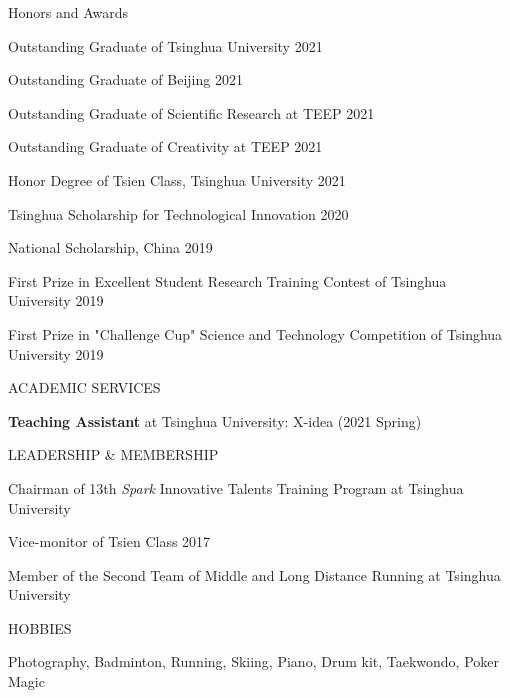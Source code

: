 \documentclass{resume} %
\begin{document}
	\begin{rSection}{Honors and Awards} {} \itemsep -2pt {}  
		\item Outstanding Graduate of Tsinghua University \hfill{2021}
		\item Outstanding Graduate of Beijing \hfill{2021}
		\item Outstanding Graduate of Scientific Research at TEEP \hfill{2021}
		\item Outstanding Graduate of Creativity at TEEP \hfill{2021}
		\item Honor Degree of Tsien Class, Tsinghua University \hfill{2021}
		\item Tsinghua Scholarship for Technological Innovation \hfill{2020}
		\item National Scholarship, China \hfill{2019}
		\item First Prize in Excellent Student Research Training Contest of Tsinghua University \hfill{2019}
		\item First Prize in "Challenge Cup" Science and Technology Competition of Tsinghua University \hfill{2019}
	\end{rSection}

	\begin{rSection}{ACADEMIC SERVICES}
		\item \textbf{Teaching Assistant} at Tsinghua University: X-idea (2021 Spring)
	\end{rSection}

	\begin{rSection}{LEADERSHIP \& MEMBERSHIP}
		\item Chairman of 13th \textsl{Spark} Innovative Talents Training Program at Tsinghua University
		\item Vice-monitor of Tsien Class 2017
		\item Member of the Second Team of Middle and Long Distance Running at Tsinghua University
	\end{rSection}

	\begin{rSection}{HOBBIES}
		\item Photography, Badminton, Running, Skiing, Piano, Drum kit, Taekwondo, Poker Magic
	\end{rSection}
	
\end{document}
